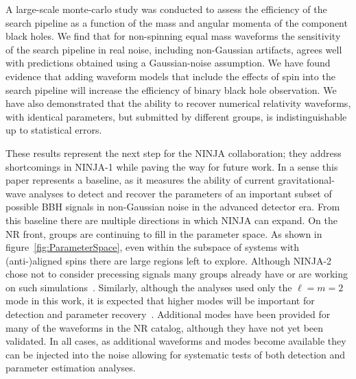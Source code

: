 A large-scale monte-carlo study was conducted to assess the efficiency of the 
\ihope{} search pipeline as a function of the mass and angular momenta of the 
component black holes. We find that for non-spinning equal mass waveforms the 
sensitivity of the \ihope{} search pipeline in real noise, including 
non-Gaussian artifacts, agrees well with predictions obtained using a 
Gaussian-noise assumption. We have found evidence that adding waveform models 
that include the effects of spin into the search pipeline will increase the 
efficiency of binary black hole observation. We have also demonstrated that the 
ability to recover numerical relativity waveforms, with identical parameters, 
but submitted by different groups, is indistinguishable up to statistical 
errors.

These results represent the next step for the NINJA collaboration;
they address shortcomings in NINJA-1 while paving the way
for future work.  In a sense this paper represents a baseline, as it
measures the ability of current gravitational-wave analyses to detect
and recover the parameters of an important subset of possible BBH
signals in non-Gaussian noise in the advanced detector era. 
From this baseline there are
multiple directions in which NINJA can expand. On the NR front,
groups are continuing to fill in the parameter space.  As shown in
figure~\ref{fig:ParameterSpace}, even within the subspace of systems
with (anti-)aligned spins there are large regions left to explore.
Although NINJA-2 chose not to consider precessing signals many groups
already have or are working on such simulations~\cite{
Campanelli:2008nk, Tichy:2007hk, Tichy:2008du,Schmidt:2010it,
O'Shaughnessy:2011fx,Mroue:2012kv,O'Shaughnessy:2012vm,
O'Shaughnessy:2012ay,Hinder:2013oqa,Taracchini:2013rva}. Similarly, although 
the analyses used only the
$\ell=m=2$ mode in this work, it is expected that higher modes will be
important for detection and parameter
recovery~\cite{Pekowsky:2012sr,Healy:2013jza,McWilliams:2010eq,Brown:2012nn,
Pan:2011gk}.  Additional modes have been provided for many of
the waveforms in the NR catalog, although they have not yet been
validated.  In all cases, as additional waveforms and modes become
available they can be injected into the noise allowing for systematic
tests of both detection and parameter estimation analyses.

